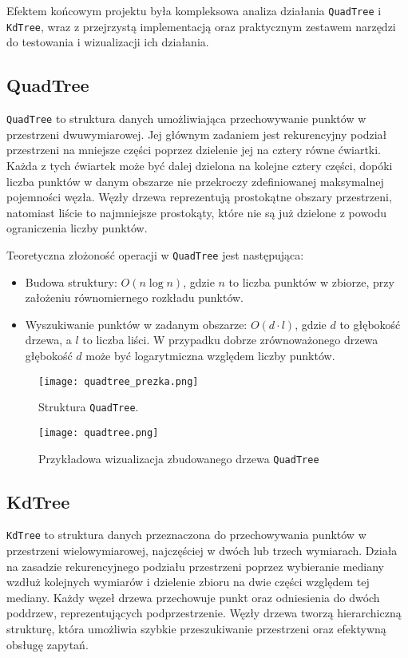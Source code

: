 \documentclass[12pt]{article}
\begin{document}
\noindent Efektem końcowym projektu była kompleksowa analiza działania \texttt{QuadTree} i \texttt{KdTree}, wraz z przejrzystą implementacją oraz praktycznym zestawem narzędzi do testowania i wizualizacji ich działania.


\subsection{QuadTree}
\texttt{QuadTree} to struktura danych umożliwiająca przechowywanie punktów w przestrzeni dwuwymiarowej. Jej głównym zadaniem jest rekurencyjny podział przestrzeni na mniejsze części poprzez dzielenie jej na cztery równe ćwiartki. Każda z tych ćwiartek może być dalej dzielona na kolejne cztery części, dopóki liczba punktów w danym obszarze nie przekroczy zdefiniowanej maksymalnej pojemności węzła. Węzły drzewa reprezentują prostokątne obszary przestrzeni, natomiast liście to najmniejsze prostokąty, które nie są już dzielone z powodu ograniczenia liczby punktów.

\noindent Teoretyczna złożoność operacji w \texttt{QuadTree} jest następująca:
\begin{itemize}
    \item Budowa struktury: $O(n \log n)$, gdzie $n$ to liczba punktów w zbiorze, przy założeniu równomiernego rozkładu punktów.
    \item Wyszukiwanie punktów w zadanym obszarze: $O(d \cdot l)$, gdzie $d$ to głębokość drzewa, a $l$ to liczba liści. W przypadku dobrze zrównoważonego drzewa głębokość \(d\) może być logarytmiczna względem liczby punktów.
\end{itemize}

\begin{figure}[h]
    \centering
    \texttt{[image: quadtree\_prezka.png]}
    \caption{Struktura \texttt{QuadTree}.}
\end{figure}
\begin{figure}[h]
    \centering
    \texttt{[image: quadtree.png]}
    \caption{Przykładowa wizualizacja zbudowanego drzewa \texttt{QuadTree}}
    \label{fig:quad}
\end{figure}



\pagebreak

\subsection{KdTree}
\texttt{KdTree} to struktura danych przeznaczona do przechowywania punktów w przestrzeni wielowymiarowej, najczęściej w dwóch lub trzech wymiarach. Działa na zasadzie rekurencyjnego podziału przestrzeni poprzez wybieranie mediany wzdłuż kolejnych wymiarów i dzielenie zbioru na dwie części względem tej mediany. Każdy węzeł drzewa przechowuje punkt oraz odniesienia do dwóch poddrzew, reprezentujących podprzestrzenie. Węzły drzewa tworzą hierarchiczną strukturę, która umożliwia szybkie przeszukiwanie przestrzeni oraz efektywną obsługę zapytań.
\end{document}
